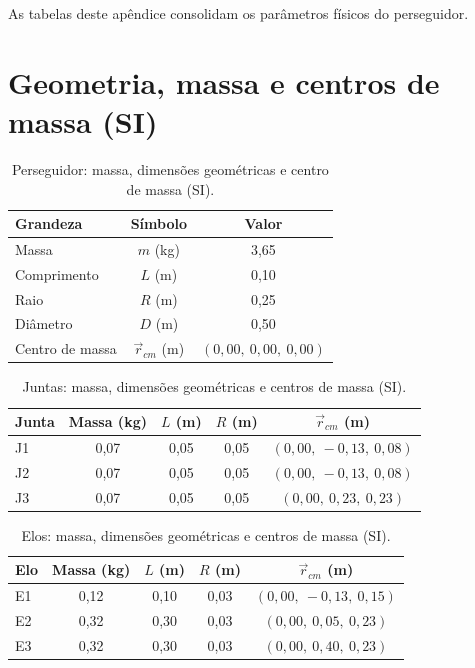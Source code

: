 \label{ap_params_perseguidor}

As tabelas deste apêndice consolidam os parâmetros físicos do perseguidor.


\section{Geometria, massa e centros de massa (SI)}

\begin{table}[H]
\centering
\caption{Perseguidor: massa, dimensões geométricas e centro de massa (SI).}
\label{tab_perseguidor_base_SI}
\begin{tabular}{lcc}
\hline
\textbf{Grandeza} & \textbf{Símbolo} & \textbf{Valor} \\
\hline
Massa & $m$ (kg) & 3,65 \\
Comprimento & $L$ (m) & 0,10 \\
Raio & $R$ (m) & 0,25 \\
Diâmetro & $D$ (m) & 0,50 \\
Centro de massa & $\vec{r}_{cm}$ (m) & $(0,00,\ 0,00,\ 0,00)$ \\
\hline
\end{tabular}
\end{table}

\begin{table}[H]
\centering
\caption{Juntas: massa, dimensões geométricas e centros de massa (SI).}
\label{tab_perseguidor_juntas_SI}
\begin{tabular}{lcccc}
\hline
\textbf{Junta} & \textbf{Massa (kg)} & \textbf{$L$ (m)} & \textbf{$R$ (m)} & \textbf{$\vec{r}_{cm}$ (m)} \\
\hline
J1 & 0,07 & 0,05 & 0,05 & $(0,00,\ -0,13,\ 0,08)$ \\
J2 & 0,07 & 0,05 & 0,05 & $(0,00,\ -0,13,\ 0,08)$ \\
J3 & 0,07 & 0,05 & 0,05 & $(0,00,\ 0,23,\ 0,23)$ \\
\hline
\end{tabular}
\end{table}

\begin{table}[H]
\centering
\caption{Elos: massa, dimensões geométricas e centros de massa (SI).}
\label{tab_perseguidor_elos_SI}
\begin{tabular}{lcccc}
\hline
\textbf{Elo} & \textbf{Massa (kg)} & \textbf{$L$ (m)} & \textbf{$R$ (m)} & \textbf{$\vec{r}_{cm}$ (m)} \\
\hline
E1 & 0,12 & 0,10 & 0,03 & $(0,00,\ -0,13,\ 0,15)$ \\
E2 & 0,32 & 0,30 & 0,03 & $(0,00,\ 0,05,\ 0,23)$ \\
E3 & 0,32 & 0,30 & 0,03 & $(0,00,\ 0,40,\ 0,23)$ \\
\hline
\end{tabular}
\end{table}

